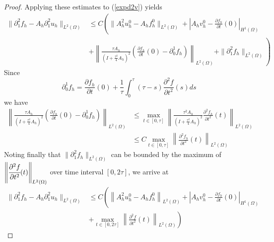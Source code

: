 \documentclass{imanum}
\begin{document}
\begin{proof}
Applying these estimates to (\ref{expd2v}) yields
  \begin{align*}
    \| \partial^2_1 f_h - A_h \partial^2_1 u_h \|_{L^2 (\Omega)} & \leq C
    \left( \| A_h^2 u^0_h - A_h f^0_h \|_{L^2 (\Omega)} + \left| A_h v^0_h -
    \frac{\partial f_h}{\partial t} (0) \right|_{H^1 (\Omega)} \right.\\
    & \left. + \left\| \frac{\tau A_h}{\left( I + \frac{\tau^2}{4} A_h
    \right)^2}  \left( \frac{\partial f_h}{\partial t} (0) - \partial^1_0 f_h
    \right) \right\|_{L^2 (\Omega)} + \| \partial^2_1 f_h \|_{L^2 (\Omega)}
    \right)
  \end{align*}
Since
  \begin{equation*}
    \partial^1_0 f_h = \frac{\partial f_h}{\partial t} (0) +
    \frac{1}{\tau}  \int^{\tau}_0 (\tau - s)  \frac{\partial^2 f}{\partial
    t^2} (s) ds
  \end{equation*}
we have
\begin{align*}
  \left\| \frac{\tau A_h}{\left( I + \frac{\tau^2}{4} A_h \right)^2} 
     \left( \frac{\partial f_h}{\partial t} (0) - \partial^1_0 f_h \right)
     \right\|_{L^2 (\Omega)} &\leq \max_{t \in [0, \tau]} \left\| \frac{\tau^2
     A_h}{\left( I + \frac{\tau^2}{4} A_h \right)^2} \frac{\partial^2
     f_h}{\partial t^2} (t) \right\|_{L^2 (\Omega)} \\
     &\leq C\max_{t \in [0,
     \tau]} \left\| \frac{\partial^2 f_h}{\partial t^2} (t) \right\|_{L^2
     (\Omega)} 
\end{align*} 
Noting finally that $\| \partial^2_1 f_h \|_{L^2(\Omega)}$ can be bounded by the maximum of $\left\| \cfrac{\partial^{2}f}{\partial t^{2}}(t)\right\|_{L^2(\Omega)}$ over time interval $[0,2\tau]$, we arrive at 
\begin{align*}
   \|\partial^{2}_1f_h-A_h\partial^{2}_1 u_h\|_{L^2(\Omega)}  &\leq  C \left( \left\|A_h^2 u^0_h - A_h f^0_h
   \right\|_{L^2(\Omega)}+ \left|A_h v^0_h - \frac{\partial f_h}{\partial t}(0) \right|_{H^1(\Omega)}\right.\\
   &\left. + \max_{t\in[0,2\tau]}\left\|\frac{\partial^2 f}{\partial t^2}(t)\right\|_{L^2(\Omega)}\right) 
\end{align*}


\end{proof}
\end{document}
